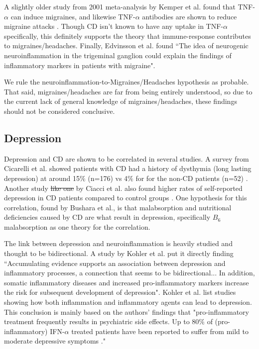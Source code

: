 \documentclass{article}
\begin{document}
A slightly older study from 2001 meta-analysis by Kemper et al. found that TNF-$\alpha$ can induce migraines, and likewise TNF-$\alpha$ antibodies are shown to reduce migraine attacks \cite{Kemper}. Though CD isn't known to have any uptake in TNF-$\alpha$ specifically, this definitely supports the theory that immune-response contributes to migraines/headaches. Finally, Edvinsson et al. found ``The idea of neurogenic neuroinflammation in the trigeminal ganglion could explain the findings of inflammatory markers in patients with migraine"\cite{Edvinsson}. 

We rule the neuroinflammation-to-Migraines/Headaches hypothesis as probable. That said, migraines/headaches are far from being entirely understood, so due to the current lack of general knowledge of migraines/headaches, these findings should not be considered conclusive. 

\subsection{Depression}

Depression and CD are shown to be correlated in several studies. A survey from Cicarelli et al. showed patients with CD had a history of dysthymia (long lasting depression) at around 15$\%$ (n=176) vs 4$\%$ for for the non-CD patients (n=52) \cite{Cicarelli}. Another study \st{like one} by Ciacci et al. also found higher rates of self-reported depression in CD patients compared to control groups \cite{Ciacci}. One hypothesis for this correlation, found by Bushara et al., is that malabsorption and nutritional deficiencies caused by CD are what result in depression, specifically $B_6$ malabsorption as one theory for the correlation\cite{Bushara}.  

The link between depression and neuroinflammation is heavily studied and thought to be bidirectional. A study by Kohler et al. put it directly finding ``Accumulating evidence supports an association between depression and inflammatory processes, a connection that seems to be bidirectional... In addition, somatic inflammatory diseases and increased pro-inflammatory markers increase the risk for subsequent development of depression"\cite{Kohler}. Kohler et al. list studies showing how both inflammation and inflammatory agents can lead to depression. This conclusion is mainly based on the authors' findings that "pro-inflammatory treatment frequently results in psychiatric side effects. Up to 80$\%$ of (pro-inflammatory) IFN-$\alpha$ treated patients have been reported to suffer from mild to moderate depressive symptoms \cite{Friebe,Eggermont,Reichenberg}." 
\end{document}
